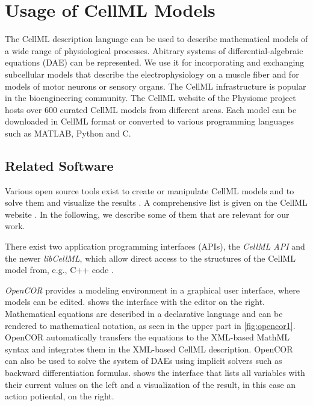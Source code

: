 
\section{Usage of CellML Models}\label{sec:usage_cellml}

The CellML description language can be used to describe mathematical models of a wide range of physiological processes. Abitrary systems of differential-algebraic equations (DAE) can be represented.
We use it for incorporating and exchanging subcellular models that describe the electrophysiology on a muscle fiber and for models of motor neurons or sensory organs.
The CellML infrastructure is popular in the bioengineering community. The CellML website of the Physiome project hosts over 600 curated CellML models from different areas. Each model can be downloaded in CellML format or converted to various programming languages such as MATLAB, Python and C.

\subsection{Related Software}\label{sec:cellml_related_software}

Various open source tools exist to create or manipulate CellML models and to solve them and visualize the results \cite{pmid18579471}. A comprehensive list is given on the CellML website \cite{cellmlWebsite}. In the following, we describe some of them that are relevant for our work.

There exist two application programming interfaces (APIs), the \emph{CellML API} and the newer \emph{libCellML}, which allow direct access to the structures of the CellML model from, e.g., C++ code \cite{pmid20377909}. 

\emph{OpenCOR} \cite{OpenCOR2015} provides a modeling environment in a graphical user interface, where models can be edited. 
 shows the interface with the editor on the right. Mathematical equations are described in a declarative language and can be rendered to mathematical notation, as seen in the upper part in \cref{fig:opencor1}. OpenCOR automatically transfers the equations to the XML-based MathML syntax and integrates them in the XML-based CellML description.
OpenCOR can also be used to solve the system of DAEs using implicit solvers such as backward differentiation formulas.  shows the interface that lists all variables with their current values on the left and a visualization of the result, in this case an action potiental, on the right.

